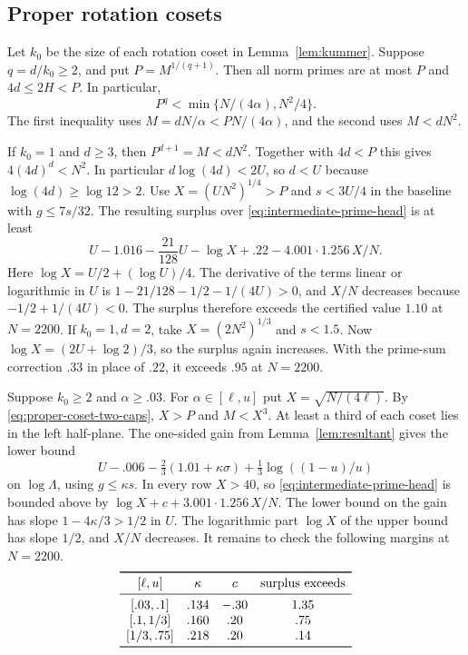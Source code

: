 \subsection{Proper rotation cosets}

Let \(k_0\) be the size of each rotation coset in
Lemma~\ref{lem:kummer}. Suppose \(q=d/k_0\ge2\), and put
\(P=M^{1/(q+1)}\). Then all norm primes are at most \(P\)
and \(4d\le2H<P\). In particular,
\begin{equation}\label{eq:proper-coset-two-caps}
 P^q<\min\{N/(4\alpha),N^2/4\}.
\end{equation}
The first inequality uses \(M=dN/\alpha<PN/(4\alpha)\),
and the second uses \(M<dN^2\).

If \(k_0=1\) and \(d\ge3\), then \(P^{d+1}=M<dN^2\).
Together with \(4d<P\) this gives \(4(4d)^d<N^2\).
In particular \(d\log(4d)<2U\), so \(d<U\) because
\(\log(4d)\ge\log12>2\).
Use \(X=(UN^2)^{1/4}>P\) and \(s<3U/4\) in the
baseline with \(g\le7s/32\). The resulting surplus over
\eqref{eq:intermediate-prime-head} is at least
\[
 U-1.016-\frac{21}{128}U
 -\log X+.22-4.001\cdot1.256\,X/N.
\]
Here \(\log X=U/2+(\log U)/4\).
The derivative of the terms linear or logarithmic in \(U\) is
\(1-21/128-1/2-1/(4U)>0\), and \(X/N\) decreases because
\(-1/2+1/(4U)<0\). The surplus therefore exceeds the certified
value \(1.10\) at \(N=2200\).
If \(k_0=1,d=2\), take \(X=(2N^2)^{1/3}\) and \(s<1.5\).
Now \(\log X=(2U+\log2)/3\), so the surplus again increases.
With the prime-sum correction \(.33\) in place of \(.22\),
it exceeds \(.95\) at \(N=2200\).

Suppose \(k_0\ge2\) and \(\alpha\ge.03\). For
\(\alpha\in[\ell,u]\) put \(X=\sqrt{N/(4\ell)}\).
By \eqref{eq:proper-coset-two-caps}, \(X>P\) and \(M<X^3\).
At least a third of each coset lies in the left half-plane.
The one-sided gain from Lemma~\ref{lem:resultant} gives the
lower bound
\[
 U-.006-\tfrac23(1.01+\kappa\sigma)
       +\tfrac13\log((1-u)/u)
\]
on \(\log\Lambda\), using \(g\le\kappa s\).
In every row \(X>40\), so \eqref{eq:intermediate-prime-head}
is bounded above by \(\log X+c+3.001\cdot1.256\,X/N\).
The lower bound on the gain has slope \(1-4\kappa/3>1/2\)
in \(U\). The logarithmic part \(\log X\) of the upper bound
has slope \(1/2\), and \(X/N\) decreases. It remains to check
the following margins at \(N=2200\).
\[
\begin{array}{cccc}
\toprule
{[\ell,u]}&\kappa&c&\text{surplus exceeds}\\
\midrule
{[.03,.1]}&.134&-.30&1.35\\
{[.1,1/3]}&.160&.20&.75\\
{[1/3,.75]}&.218&.20&.14\\
\bottomrule
\end{array}
\]

